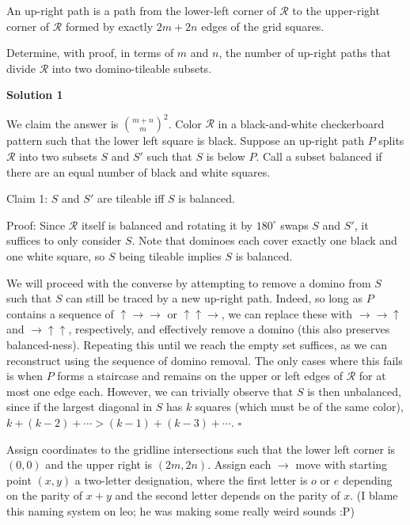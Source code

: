 \begin{enumerate}
 An up-right path is a path from the lower-left corner of $\mathcal R$ to the upper-right corner of $\mathcal R$ formed by exactly $2m+2n$ edges of the grid squares.


 Determine, with proof, in terms of $m$ and $n$, the number of up-right paths that divide $\mathcal R$ into two domino-tileable subsets.


 



\textbf{Solution 1}

We claim the answer is $\boxed{\binom{m+n}{m}^2}$. Color $\mathcal R$ in a black-and-white checkerboard pattern such that the lower left square is black. Suppose an up-right path $P$ splits $\mathcal R$ into two subsets $S$ and $S'$ such that $S$ is below $P$. Call a subset balanced if there are an equal number of black and white squares.

 Claim 1: $S$ and $S'$ are tileable iff $S$ is balanced.

 Proof: Since $\mathcal R$ itself is balanced and rotating it by $180^\circ$ swaps $S$ and $S'$, it suffices to only consider $S$. Note that dominoes each cover exactly one black and one white square, so $S$ being tileable implies $S$ is balanced.

 We will proceed with the converse by attempting to remove a domino from $S$ such that $S$ can still be traced by a new up-right path. Indeed, so long as $P$ contains a sequence of $\uparrow\rightarrow\rightarrow$ or $\uparrow\uparrow\rightarrow$, we can replace these with $\rightarrow\rightarrow\uparrow$ and $\rightarrow\uparrow\uparrow$, respectively, and effectively remove a domino (this also preserves balanced-ness). Repeating this until we reach the empty set suffices, as we can reconstruct using the sequence of domino removal. The only cases where this fails is when $P$ forms a staircase and remains on the upper or left edges of $\mathcal R$ for at most one edge each. However, we can trivially observe that $S$ is then unbalanced, since if the largest diagonal in $S$ has $k$ squares (which must be of the same color), $k+(k-2)+\cdots>(k-1)+(k-3)+\cdots$. $\square$

 Assign coordinates to the gridline intersections such that the lower left corner is $(0,0)$ and the upper right is $(2m,2n)$. Assign each $\rightarrow$ move with starting point $(x,y)$ a two-letter designation, where the first letter is $o$ or $e$ depending on the parity of $x+y$ and the second letter depends on the parity of $x$. (I blame this naming system on leo; he was making some really weird sounds :P)


\end{enumerate}

